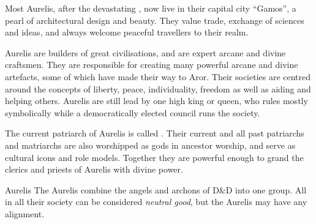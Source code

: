 Most Aurelis, after the devastating , now live in
their capital city ``Gamos'', a pearl of architectural design and beauty. They
value trade, exchange of sciences and ideas, and always welcome peaceful
travellers to their realm.

Aurelis are builders of great civilisations, and are expert arcane and divine
craftsmen. They are responsible for creating many powerful arcane and divine
artefacts, some of which have made their way to Aror. Their societies are
centred around the concepts of liberty, peace, individuality, freedom as well
as aiding and helping others. Aurelis are still lead by one high king or
queen, who rules mostly symbolically while a democratically elected council
runs the society.

The current patriarch of Aurelis is called . Their current
and all past patriarchs and matriarchs are also worshipped as gods in ancestor
worship, and serve as cultural icons and role models. Together they are
powerful enough to grand the clerics and priests of Aurelis with divine power.

\begin{35e}{Aurelis}
  The Aurelis combine the angels and archons of D\&D into one group. All in all
  their society can be considered \emph{neutral good}, but the Aurelis may have
  any alignment.
\end{35e}
